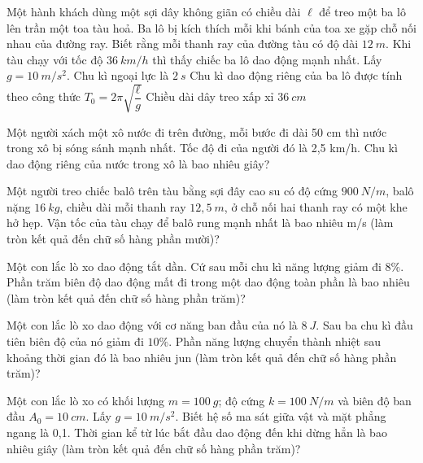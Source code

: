 \begin{ex}
Một hành khách dùng một sợi dây không giãn có chiều dài $\ell$ để treo một ba lô lên trần một toa tàu hoả. Ba lô bị kích thích mỗi khi bánh của toa xe gặp chỗ nối nhau của đường ray. Biết rằng mỗi thanh ray của đường tàu có độ dài $12\ m$. Khi tàu chạy với tốc độ $36\ km/h$ thì thấy chiếc ba lô dao động mạnh nhất. Lấy $g=10\ m/s^2$.
{Chu kì ngoại lực là $2\ s$}
{\True Chu kì dao động riêng của ba lô được tính theo công thức \linebreak $T_{0} = 2 \pi \sqrt{\dfrac{\ell}{g}}$}
{\True Chiều dài dây treo xấp xỉ $36\ cm$}
\loigiai{
\begin{itemchoice}
\itemch 
\itemch 
\itemch 
\itemch 
\end{itemchoice}
}
\end{ex}
\PhanIII
\setcounter{ex}{0}
\begin{ex}
Một người xách một xô nước đi trên đường, mỗi bước đi dài 50 cm thì nước trong xô bị sóng sánh mạnh nhất. Tốc độ đi của người đó là 2,5 km/h. Chu kì dao động riêng của nước trong xô là bao nhiêu giây?
\loigiai{

}
\end{ex} 
\begin{ex}
Một người treo chiếc balô trên tàu bằng sợi đây cao su có độ cứng $900 \ N/m$, balô nặng $16 \ kg$, chiều dài mỗi thanh ray $12,5 \ m$, ở chỗ nối hai thanh ray có một khe hở hẹp. Vận tốc của tàu chạy để balô rung mạnh nhất là bao nhiêu m/s (làm tròn kết quả đến chữ số hàng phần mười)?
\end{ex} 
\begin{ex}
Một con lắc lò xo dao động tắt dần. Cứ sau mỗi chu kì năng lượng giảm đi $8 \%$. Phần trăm biên độ dao động mất đi trong một dao động toàn phần là bao nhiêu (làm tròn kết quả đến chữ số hàng phần trăm)?
\end{ex} 
\begin{ex}
Một con lắc lò xo dao động với cơ năng ban đầu của nó là $8 \ J$. Sau ba chu kì đầu tiên biên độ của nó giảm đi $10 \%$. Phần năng lượng chuyển thành nhiệt sau khoảng thời gian đó là bao nhiêu jun  (làm tròn kết quả đến chữ số hàng phần trăm)?
\end{ex} 
\begin{ex}
Một con lắc lò xo có khối lượng $m=100 \ g$; độ cứng $k=100 \ N/m$ và biên độ ban đầu $A_0=10 \ cm$. Lấy $g=10 \ m/s^2$. Biết hệ số ma sát giữa vật và mặt phẳng ngang là 0,1. Thời gian kể từ lúc bắt đầu dao động đến khi dừng hẳn là bao nhiêu giây (làm tròn kết quả đến chữ số hàng phần trăm)?
\end{ex} 
